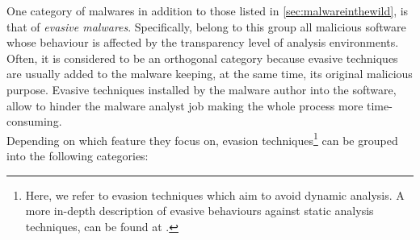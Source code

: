 \documentclass[LaM,binding=0.6cm]{sapthesis}
\begin{document}
One category of malwares in addition to those listed in \autoref{sec:malwareinthewild}, is that of \textit{evasive malwares}. Specifically, belong to this group all malicious software whose behaviour is affected by the transparency level of analysis environments. Often, it is considered to be an orthogonal category because evasive techniques are usually added to the malware keeping, at the same time, its original malicious purpose. Evasive techniques installed by the malware author into the software, allow to hinder the malware analyst job making the whole process more time-consuming.\\
Depending on which feature they focus on, evasion techniques\footnote{Here, we refer to evasion techniques which aim to avoid dynamic analysis. A more in-depth description of evasive behaviours against static analysis techniques, can be found at \cite{moser2007limits}.} can be grouped into the following categories:
\end{document}
